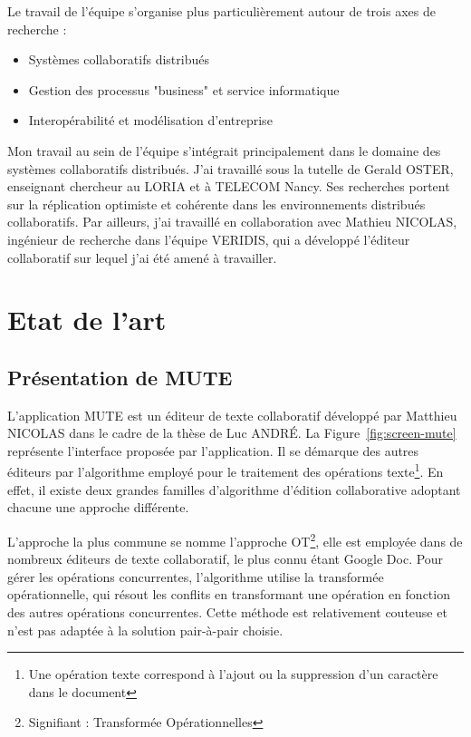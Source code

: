 \documentclass{tnreport}
\begin{document}
Le travail de l'équipe s'organise plus particulièrement autour de trois axes de recherche :

\begin{itemize}
  \item Systèmes collaboratifs distribués
  \item Gestion des processus "business" et service informatique
  \item Interopérabilité et modélisation d'entreprise
\end{itemize}

Mon travail au sein de l'équipe s'intégrait principalement dans le domaine des systèmes collaboratifs distribués. J'ai travaillé sous la tutelle de Gerald OSTER, enseignant chercheur au LORIA et à TELECOM Nancy. Ses recherches portent sur la réplication optimiste et cohérente dans les environnements distribués collaboratifs. Par ailleurs, j'ai travaillé en collaboration avec Mathieu NICOLAS, ingénieur de recherche dans l'équipe VERIDIS, qui a développé l'éditeur collaboratif sur lequel j'ai été amené à travailler.  

\cleardoublepage


\chapter{Etat de l'art}

\section{Présentation de MUTE}

L'application MUTE est un éditeur de texte collaboratif développé par Matthieu NICOLAS dans le cadre de la thèse de Luc ANDRÉ. La Figure~\ref{fig:screen-mute} représente l'interface proposée par l'application. Il se démarque des autres éditeurs par l'algorithme employé pour le traitement des opérations texte\footnote{Une opération texte correspond à l'ajout ou la suppression d'un caractère dans le document}. En effet, il existe deux grandes familles d'algorithme d'édition collaborative adoptant chacune une approche différente. 

L'approche la plus commune se nomme l'approche OT\footnote{Signifiant : Transformée Opérationnelles}, elle est employée dans de nombreux éditeurs de texte collaboratif, le plus connu étant Google Doc. Pour gérer les opérations concurrentes, l'algorithme utilise la transformée opérationnelle, qui résout les conflits en transformant une opération en fonction des autres opérations concurrentes. Cette méthode est relativement couteuse et n'est pas adaptée à la solution pair-à-pair choisie. 
\end{document}
